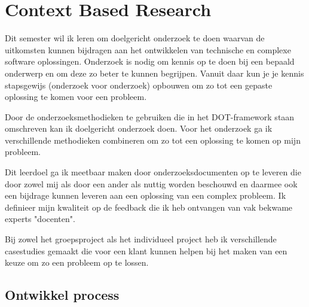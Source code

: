 
\section{Context Based Research}\label{sec:context-based-research}


Dit semester wil ik leren om doelgericht onderzoek te doen waarvan de uitkomsten kunnen bijdragen aan het ontwikkelen van technische en complexe software oplossingen.
Onderzoek is nodig om kennis op te doen bij een bepaald onderwerp en om deze zo beter te kunnen begrijpen.
Vanuit daar kun je je kennis stapsgewijs (onderzoek voor onderzoek) opbouwen om zo tot een gepaste oplossing te
komen voor een probleem.


Door de onderzoeksmethodieken te gebruiken die in het DOT-framework staan omschreven kan ik doelgericht onderzoek
doen.
Voor het onderzoek ga ik verschillende methodieken combineren om zo tot een oplossing te komen op mijn probleem.


Dit leerdoel ga ik meetbaar maken door onderzoeksdocumenten op te leveren die door zowel mij als door een ander als
nuttig worden beschouwd en daarmee ook een bijdrage kunnen leveren aan een oplossing van een complex probleem.
Ik definieer mijn kwaliteit op de feedback die ik heb ontvangen van vak bekwame experts "docenten".

Bij zowel het groepsproject als het individueel project heb ik verschillende casestudies gemaakt die voor een klant
kunnen helpen bij het maken van een keuze om zo een probleem op te lossen.

\bigskip
\subsection{Ontwikkel process}
